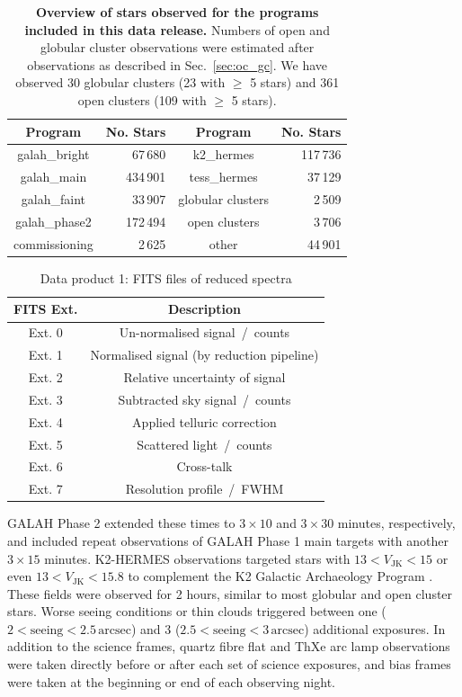\documentclass[
  journal=pasa,
  manuscript=research-paper, %
  year=2024,
  volume=37
]{cup-journal}
\begin{document}
\begin{table}
\centering
 \caption{\textbf{Overview of stars observed for the programs included in this data release.} Numbers of open and globular cluster observations were estimated after observations as described in Sec.~\ref{sec:oc_gc}. We have observed 30 globular clusters (23 with $\geq$ 5 stars) and 361 open clusters (109 with $\geq$ 5 stars).}
\label{tab:field_ids}
\begin{tabular}{crcr}
\hline \hline
Program & No. Stars & Program & No. Stars \\
\hline
galah\_bright & 67\,680 & 
k2\_hermes & 117\,736\\
galah\_main & 434\,901 & 
tess\_hermes & 37\,129\\
galah\_faint & 33\,907 & 
globular clusters & 2\,509\\ %
galah\_phase2 & 172\,494 & 
open clusters & 3\,706\\ %
commissioning & 2\,625 & 
other & 44\,901\\
  \hline
 \end{tabular}
\end{table}

\begin{table}
    \centering
    \caption{Data product 1: FITS files of reduced spectra}
    \label{tab:reduction_fits}
    \begin{tabular}{cc}
    \hline \hline
    FITS Ext. & Description \\
    \hline
    Ext. 0 & Un-normalised signal~/~counts \\
    Ext. 1 & Normalised signal (by reduction pipeline) \\
    Ext. 2 & Relative uncertainty of signal \\
    Ext. 3 & Subtracted sky signal~/~counts \\
    Ext. 4 & Applied telluric correction \\
    Ext. 5 & Scattered light~/~counts \\
    Ext. 6 & Cross-talk \\
    Ext. 7 & Resolution profile~/~FWHM \\
    \hline
    \end{tabular}
\end{table}

GALAH Phase 2 extended these times to $3 \times 10$ and $3 \times 30$ minutes, respectively, and included repeat observations of GALAH Phase 1 main targets with another $3 \times 15$ minutes. K2-HERMES observations targeted stars with $13 < V_\mathrm{JK} < 15$ or even $13 < V_\mathrm{JK} < 15.8$ to complement the K2 Galactic Archaeology Program \citep{Stello2015}. These fields were observed for 2 hours, similar to most globular and open cluster stars. Worse seeing conditions or thin clouds triggered between one ($2 < \mathrm{seeing} < 2.5\,\mathrm{arcsec}$) and 3 ($2.5 < \mathrm{seeing} < 3\,\mathrm{arcsec}$) additional exposures. In addition to the science frames, quartz fibre flat and ThXe arc lamp observations were taken directly before or after each set of science exposures, and bias frames were taken at the beginning or end of each observing night.
\end{document}
